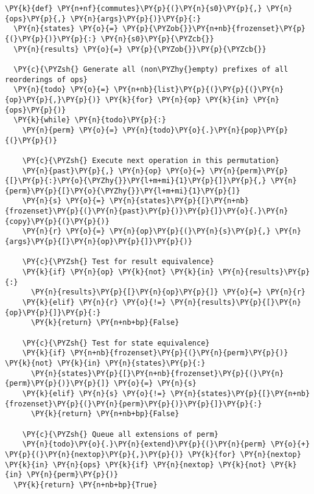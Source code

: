 \begin{Verbatim}[commandchars=\\\{\}]
\PY{k}{def} \PY{n+nf}{commutes}\PY{p}{(}\PY{n}{s0}\PY{p}{,} \PY{n}{ops}\PY{p}{,} \PY{n}{args}\PY{p}{)}\PY{p}{:}
  \PY{n}{states} \PY{o}{=} \PY{p}{\PYZob{}}\PY{n+nb}{frozenset}\PY{p}{(}\PY{p}{)}\PY{p}{:} \PY{n}{s0}\PY{p}{\PYZcb{}}
  \PY{n}{results} \PY{o}{=} \PY{p}{\PYZob{}}\PY{p}{\PYZcb{}}

  \PY{c}{\PYZsh{} Generate all (non\PYZhy{}empty) prefixes of all reorderings of ops}
  \PY{n}{todo} \PY{o}{=} \PY{n+nb}{list}\PY{p}{(}\PY{p}{(}\PY{n}{op}\PY{p}{,}\PY{p}{)} \PY{k}{for} \PY{n}{op} \PY{k}{in} \PY{n}{ops}\PY{p}{)}
  \PY{k}{while} \PY{n}{todo}\PY{p}{:}
    \PY{n}{perm} \PY{o}{=} \PY{n}{todo}\PY{o}{.}\PY{n}{pop}\PY{p}{(}\PY{p}{)}

    \PY{c}{\PYZsh{} Execute next operation in this permutation}
    \PY{n}{past}\PY{p}{,} \PY{n}{op} \PY{o}{=} \PY{n}{perm}\PY{p}{[}\PY{p}{:}\PY{o}{\PYZhy{}}\PY{l+m+mi}{1}\PY{p}{]}\PY{p}{,} \PY{n}{perm}\PY{p}{[}\PY{o}{\PYZhy{}}\PY{l+m+mi}{1}\PY{p}{]}
    \PY{n}{s} \PY{o}{=} \PY{n}{states}\PY{p}{[}\PY{n+nb}{frozenset}\PY{p}{(}\PY{n}{past}\PY{p}{)}\PY{p}{]}\PY{o}{.}\PY{n}{copy}\PY{p}{(}\PY{p}{)}
    \PY{n}{r} \PY{o}{=} \PY{n}{op}\PY{p}{(}\PY{n}{s}\PY{p}{,} \PY{n}{args}\PY{p}{[}\PY{n}{op}\PY{p}{]}\PY{p}{)}

    \PY{c}{\PYZsh{} Test for result equivalence}
    \PY{k}{if} \PY{n}{op} \PY{k}{not} \PY{k}{in} \PY{n}{results}\PY{p}{:}
      \PY{n}{results}\PY{p}{[}\PY{n}{op}\PY{p}{]} \PY{o}{=} \PY{n}{r}
    \PY{k}{elif} \PY{n}{r} \PY{o}{!=} \PY{n}{results}\PY{p}{[}\PY{n}{op}\PY{p}{]}\PY{p}{:}
      \PY{k}{return} \PY{n+nb+bp}{False}

    \PY{c}{\PYZsh{} Test for state equivalence}
    \PY{k}{if} \PY{n+nb}{frozenset}\PY{p}{(}\PY{n}{perm}\PY{p}{)} \PY{k}{not} \PY{k}{in} \PY{n}{states}\PY{p}{:}
      \PY{n}{states}\PY{p}{[}\PY{n+nb}{frozenset}\PY{p}{(}\PY{n}{perm}\PY{p}{)}\PY{p}{]} \PY{o}{=} \PY{n}{s}
    \PY{k}{elif} \PY{n}{s} \PY{o}{!=} \PY{n}{states}\PY{p}{[}\PY{n+nb}{frozenset}\PY{p}{(}\PY{n}{perm}\PY{p}{)}\PY{p}{]}\PY{p}{:}
      \PY{k}{return} \PY{n+nb+bp}{False}

    \PY{c}{\PYZsh{} Queue all extensions of perm}
    \PY{n}{todo}\PY{o}{.}\PY{n}{extend}\PY{p}{(}\PY{n}{perm} \PY{o}{+} \PY{p}{(}\PY{n}{nextop}\PY{p}{,}\PY{p}{)} \PY{k}{for} \PY{n}{nextop} \PY{k}{in} \PY{n}{ops} \PY{k}{if} \PY{n}{nextop} \PY{k}{not} \PY{k}{in} \PY{n}{perm}\PY{p}{)}
  \PY{k}{return} \PY{n+nb+bp}{True}
\end{Verbatim}
